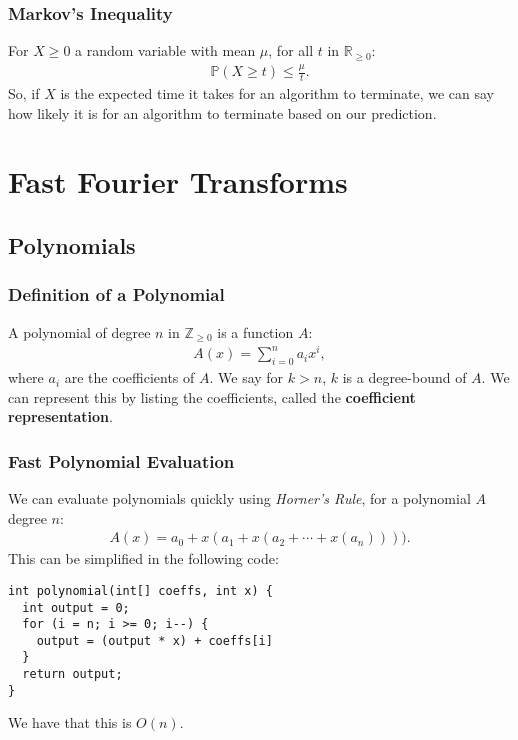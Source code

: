 \documentclass[a4paper, 12pt, twoside]{article}
\begin{document}
\subsubsection{Markov's Inequality}

For $X \geq 0$ a random variable with mean $\mu$, for all
$t$ in $\mathbb{R}_{\geq 0}$: \begin{gather*}
  \mathbb{P}(X \geq t) \leq \frac{\mu}{t}.
\end{gather*} So, if $X$ is the expected time it takes for an 
algorithm to terminate, we can say how likely it is for an algorithm
to terminate based on our prediction.

\section{Fast Fourier Transforms}

\subsection{Polynomials}

\subsubsection{Definition of a Polynomial}

A polynomial of degree $n$ in $\mathbb{Z}_{\geq 0}$ is a function $A$: 
\begin{gather*}
  A(x) = \sum_{i = 0}^n a_ix^i,
\end{gather*} where $a_i$ are the coefficients of $A$. We say for 
$k > n$, $k$ is a degree-bound of $A$. We can represent this by listing
the coefficients, called the \textbf{coefficient representation}.

\subsubsection{Fast Polynomial Evaluation}

We can evaluate polynomials quickly using \textit{Horner's Rule},
for a polynomial $A$ degree $n$: \begin{gather*}
  A(x) = a_0 + x(a_1 + x(a_2 + \cdots + x(a_n)))).
\end{gather*} This can be simplified in the following code:
\begin{verbatim}
int polynomial(int[] coeffs, int x) {
  int output = 0;
  for (i = n; i >= 0; i--) {
    output = (output * x) + coeffs[i]
  }
  return output;
}
\end{verbatim} We have that this is $O(n)$.
\end{document}
